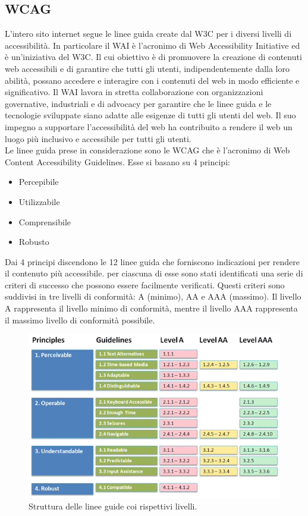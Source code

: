 \documentclass[a4paper,final,12pt]{report}
\begin{document}
\subsection{WCAG}
L'intero sito internet segue le linee guida create dal W3C per i diversi livelli di accessibilità.
In particolare il WAI è l'acronimo di Web Accessibility Initiative ed è un'iniziativa del W3C. Il cui obiettivo è di promuovere la creazione di contenuti web accessibili e di garantire che tutti gli utenti, indipendentemente dalla loro abilità, possano accedere e interagire con i contenuti del web in modo efficiente e significativo. Il WAI lavora in stretta collaborazione con organizzazioni governative, industriali e di advocacy per garantire che le linee guida e le tecnologie sviluppate siano adatte alle esigenze di tutti gli utenti del web. Il suo impegno a supportare l'accessibilità del web ha contribuito a rendere il web un luogo più inclusivo e accessibile per tutti gli utenti.\\
Le linee guida prese in considerazione sono le WCAG che è l'acronimo di Web Content Accessibility Guidelines.
Esse si basano su 4 principi:
\begin{itemize}
\item Percepibile
\item Utilizzabile
\item Comprensibile
\item Robusto
\end{itemize}
Dai 4 principi discendono le 12 linee guida che
forniscono indicazioni per rendere il contenuto più accessibile. per ciascuna di esse sono stati identificati una serie di criteri di successo che possono essere facilmente verificati. Questi criteri sono suddivisi in tre livelli di conformità: A (minimo), AA e AAA (massimo). Il livello A rappresenta il livello minimo di conformità, mentre il livello AAA rappresenta il massimo livello di conformità possibile.

\begin{figure}[hbtp]
\centering
\includegraphics[scale=0.50]{img_concettuale/wcag.png}
\caption{Struttura delle linee guide coi rispettivi livelli.}
\end{figure}
\end{document}
